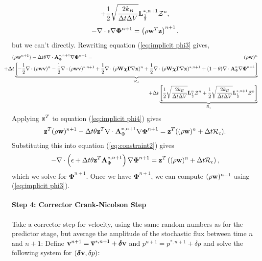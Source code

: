\documentclass[final]{siamltex}
\def\Ab {{\bf A}}
\def\Lb {{\bf L}}
\def\vb {{\bf v}}
\def\wb {{\bf w}}
\def\Wb {{\bf W}}
\def\xb {{\bf x}}
\def\zb {{\bf z}}
\def\chib   {\boldsymbol{\chi}}
\def\deltab {\boldsymbol{\delta}}
\def\Gammab {\boldsymbol{\Gamma}}
\def\Phib   {\boldsymbol{\Phi}}
\def\half   {\frac{1}{2}}
\begin{document}
{\begin{eqnarray}
+ \half\sqrt{\frac{2k_B}{\Delta t\Delta V}}\Lb_\half^{*,n+1}\mathcal{Z}^n,\label{eq:implicit phi3}
\end{eqnarray}
\begin{equation}
-\nabla\cdot\epsilon\nabla\Phib^{n+1} = \left(\rho\wb^T\zb\right)^{n+1},\label{eq:constraint2}
\end{equation}
but we can't directly.  Rewriting equation (\ref{eq:implicit phi3} gives,
\begin{eqnarray}
(\rho\wb^{n+1}) - \Delta t\theta\nabla\cdot \Ab_\Phi^{*,n+1}\nabla\Phib^{n+1} &=& (\rho\wb)^n\nonumber\\
&&\hspace{-2.5in}+ \Delta t\underbrace{\left[-\half\nabla\cdot(\rho\wb\vb)^n - \half\nabla\cdot(\rho\wb\vb)^{*,n+1} + \half\nabla\cdot(\rho\Wb\chib\Gammab\nabla\xb)^n + \half\nabla\cdot(\rho\Wb\chib\Gammab\nabla\xb)^{*,n+1}+ (1-\theta)\nabla\cdot \Ab_\Phi^n\nabla\Phib^{n+1} \right]}_{\mathcal{R}_c}\label{eq:implicit phi4}\nonumber\\
&&\hspace{-2.5in}+ \Delta t\underbrace{\left[
\half\sqrt{\frac{2k_B}{\Delta t\Delta V}}\Lb_\half^n\mathcal{Z}^n
+ \half\sqrt{\frac{2k_B}{\Delta t\Delta V}}\Lb_\half^{*,n+1}\mathcal{Z}^n
\right]}_{\mathcal{R}_c}
\end{eqnarray}
Applying $\zb^T$ to equation (\ref{eq:implicit phi4}) gives
\begin{equation}
\zb^T(\rho\wb)^{n+1} - \Delta t\theta\zb^T\nabla\cdot \Ab_\Phi^{*,n+1}\nabla\Phib^{n+1} = \zb^T((\rho\wb)^n + \Delta t\mathcal{R}_c).
\end{equation}
Substituting this into equation (\ref{eq:constraint2}) gives
\begin{equation}
-\nabla\cdot\left(\epsilon + \Delta t\theta\zb^T \Ab_\Phi^{*,n+1}\right)\nabla\Phib^{n+1} = \zb^T\left((\rho\wb)^n + \Delta t\mathcal{R}_c\right),
\end{equation}
which we solve for $\Phib^{n+1}$.  Once we have $\Phib^{n+1}$, we can compute 
$(\rho\wb)^{n+1}$ using (\ref{eq:implicit phi3}).\\ \\
{\bf Step 4: Corrector Crank-Nicolson Step}\\ \\
Take a corrector step for velocity, using the same random numbers as for the predictor
stage, but average the amplitude of the stochastic flux between time $n$ and $n+1$:
Define $\vb^{n+1} = \overline\vb^{*,n+1} + \deltab\vb$ and $p^{n+1} = p^{*,n+1} + \delta p$ and
solve the following system for $(\deltab\vb,\delta p)$:
}
\end{document}
